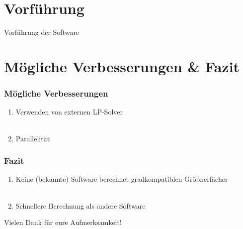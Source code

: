 \documentclass{beamer}
\begin{document}
\section{Vorführung}
\begin{frame}

\centerline{Vorführung der Software}


\end{frame}

\section{Mögliche Verbesserungen \& Fazit}
 
\begin{frame}
\frametitle{Mögliche Verbesserungen}


\begin{enumerate}
\item Verwenden von externen LP-Solver %
~\\ ~\\
\item Parallelität
\end{enumerate}


\end{frame}


\begin{frame}
\frametitle{Fazit}
\begin{enumerate}
\item Keine (bekannte) Software berechnet gradkompatiblen Gröbnerfächer %
~\\ ~\\
\item Schnellere Berechnung als andere Software
\end{enumerate}


\end{frame} 
 
 
 
 
\begin{frame}
\centerline{Vielen Dank f{\"u}r eure Aufmerksamkeit!}
\end{frame}
\end{document}
